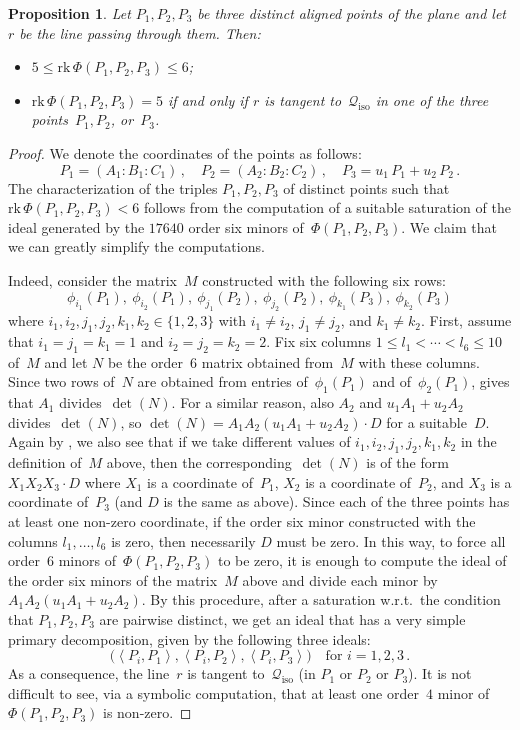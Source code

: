\documentclass[a4paper, 11pt, reqno]{amsart}
\theoremstyle{plain}
\newtheorem{prop}[lemma]{Proposition}
\theoremstyle{definition}
\newcommand{\rk}{\ensuremath{\mathrm{rk}}}
\newcommand{\iso}{\mathcal{Q}_{\mathrm{iso}}}
\newcommand{\scl}[2]{\left\langle {#1}, {#2} \right\rangle}
\begin{document}
\begin{prop}
\label{proposition:three_aligned_ranks}
Let $P_1, P_2, P_3$ be three distinct aligned points of the plane and let
$r$ be the line passing through them. Then:
%
\begin{itemize}
  \item $5 \leq \rk \,\Phi(P_1, P_2, P_3) \leq 6$;
  \item $\rk \,\Phi(P_1, P_2, P_3) = 5$ if and only if $r$ is tangent to~$\iso$ in one of the three points~$P_1, P_2$, or~$P_3$.
\end{itemize}
%
\end{prop}
\begin{proof} We denote the coordinates of the points as follows:
%
\[
  P_1 = (A_1: B_1: C_1) \,, \quad
  P_2 = (A_2: B_2: C_2) \,, \quad
  P_3 = u_1 \, P_1 + u_2 \, P_2 \,.
\]
%
The characterization of the triples $P_1, P_2, P_3$ of distinct points such that $\rk \,\Phi(P_1, P_2, P_3) < 6$ follows from the computation of a suitable saturation of the ideal generated by the $17640$ order six minors of~$\Phi(P_1, P_2, P_3)$.
We claim that we can greatly simplify the computations.

Indeed, consider the matrix~$M$ constructed with the following six rows:
%
\[
  \phi_{i_1}(P_1), \ \phi_{i_2}(P_1), \
  \phi_{j_1}(P_2),\ \phi_{j_2}(P_2), \
  \phi_{k_1}(P_3), \ \phi_{k_2}(P_3)
\]
%
where $i_1, i_2, j_1, j_2, k_1, k_2 \in \{1, 2, 3\}$ with $i_1 \neq i_2$, $j_1 \neq j_2$, and $k_1 \neq k_2$.
First, assume that $i_1=j_1=k_1=1$ and $i_2=j_2=k_2=2$.
Fix six columns $1\leq l_1 < \cdots < l_6 \leq 10$ of~$M$ and let $N$ be the order~$6$ matrix obtained from~$M$ with these columns.
Since two rows of~$N$ are obtained from
entries of~$\phi_1(P_1)$ and of~$\phi_2(P_1)$,
\Cref{lemma:minors} gives that $A_1$ divides~$\det(N)$. For a similar
reason, also $A_2$ and $u_1A_1+u_2A_2$ divides~$\det(N)$, so
$\det(N) = A_1A_2(u_1A_1+u_2A_2)\cdot D$ for a suitable~$D$.
Again by \Cref{lemma:minors}, we also see that if we take different values of $i_1, i_2, j_1, j_2, k_1, k_2$ in the definition of~$M$ above, then
the corresponding~$\det(N)$ is of the form $X_1X_2X_3\cdot D$ where
$X_1$ is a coordinate of~$P_1$, $X_2$ is a coordinate of~$P_2$, and $X_3$ is
a coordinate of~$P_3$ (and $D$ is the same as above).
Since each of the three points has at least one non-zero coordinate,
if the order six minor constructed with the columns $l_1, \dots, l_6$ is zero, 
then necessarily $D$ must be zero. 
In this way, to force all order~$6$ minors of~$\Phi(P_1, P_2, P_3)$ to be zero,
it is enough to compute the ideal of the order six minors of the matrix~$M$ above
and divide each minor by $A_1A_2(u_1A_1+u_2A_2)$. 
By this procedure, after a saturation w.r.t.\ the condition that $P_1, P_2, P_3$ are pairwise distinct,
we get an ideal that has a very simple primary decomposition, 
given by the following three ideals:
%
\[
  \bigl( \scl{P_i}{P_1}, \scl{P_i}{P_2}, \scl{P_i}{P_3} \bigr) \quad
  \mbox{for } i = 1, 2, 3 \,.
\]
%
As a consequence, the line~$r$ is tangent to~$\iso$
(in $P_1$ or $P_2$ or $P_3$).
It is not difficult to see, via a symbolic computation,
that at least one order~$4$ minor of~$\Phi(P_1, P_2, P_3)$ is non-zero.
\end{proof}
\end{document}
